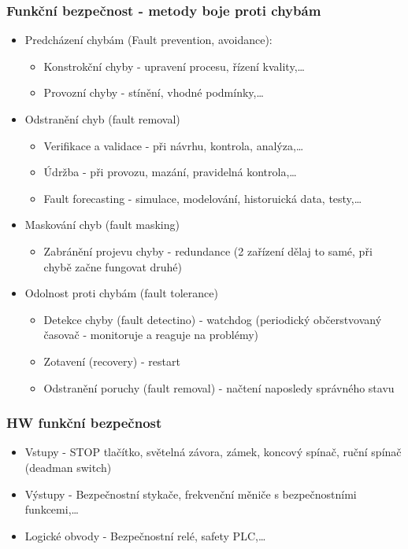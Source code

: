 \subsubsection*{Funkční bezpečnost - metody boje proti chybám}
\begin{itemize}
    \item Predcházení chybám (Fault prevention, avoidance): \begin{itemize}
              \item Konstrokční chyby - upravení procesu, řízení kvality,\dots
              \item Provozní chyby - stínění, vhodné podmínky,\dots
          \end{itemize}
    \item Odstranění chyb (fault removal) \begin{itemize}
              \item Verifikace a validace - při návrhu, kontrola, analýza,\dots
              \item Údržba - při provozu, mazání, pravidelná kontrola,\dots
              \item Fault forecasting - simulace, modelování, historuická data, testy,\dots
          \end{itemize}
    \item Maskování chyb (fault masking) \begin{itemize}
              \item Zabránění projevu chyby - redundance (2 zařízení dělaj to samé, při chybě začne fungovat druhé)
          \end{itemize}
    \item Odolnost proti chybám (fault tolerance) \begin{itemize}
              \item Detekce chyby (fault detectino) - watchdog (periodický občerstvovaný časovač - monitoruje a reaguje na problémy)
              \item Zotavení (recovery) - restart
              \item Odstranění poruchy (fault removal) - načtení naposledy správného stavu
          \end{itemize}
\end{itemize}

\subsubsection*{HW funkční bezpečnost}
\begin{itemize}
    \item Vstupy - STOP tlačítko, světelná závora, zámek, koncový spínač, ruční spínač (deadman switch)
    \item Výstupy - Bezpečnostní stykače, frekvenční měniče s bezpečnostními funkcemi,\dots
    \item Logické obvody - Bezpečnostní relé, safety PLC,\dots
\end{itemize}

